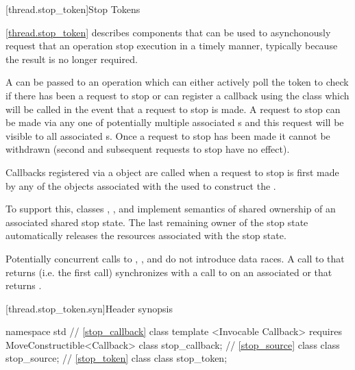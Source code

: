 {\color{insertcolor}

[thread.stop_token]{Stop Tokens}

\pnum
\ref{thread.stop_token} describes components that can be used to
asynchonously request that an operation stop execution in a timely
manner, typically because the result is no longer required.

\pnum
A  can be passed to an operation which can either
actively poll the token to check if there has been a request to stop
or can register a callback using the  class which
will be called in the event that a request to stop is made. A request
to stop can be made via any one of potentially multiple associated
s and this request will be visible to all associated
s. Once a request to stop has been made it cannot be
withdrawn (second and subsequent requests to stop have no effect).

\pnum
Callbacks registered via a  object are called when
a request to stop is first made by any of the  objects
associated with the  used to construct the .

\pnum
To support this, classes , , and 
implement semantics of shared ownership of an associated shared stop state.
The last remaining owner of the stop state automatically 
releases the resources associated with the stop state.

\pnum
Potentially concurrent calls to , ,
and 
do not introduce data races. 
A call to  that returns  (i.e. the first call)
synchronizes with a call to  on an associated 
or  that returns .

[thread.stop_token.syn]{Header  synopsis}
%

\begin{codeblock}
namespace std {
  // \ref{stop_callback} class 
  template <Invocable Callback>
    requires MoveConstructible<Callback>
  class stop_callback;
  // \ref{stop_source} class 
  class stop_source;
  // \ref{stop_token} class 
  class stop_token;
}
\end{codeblock}


}
